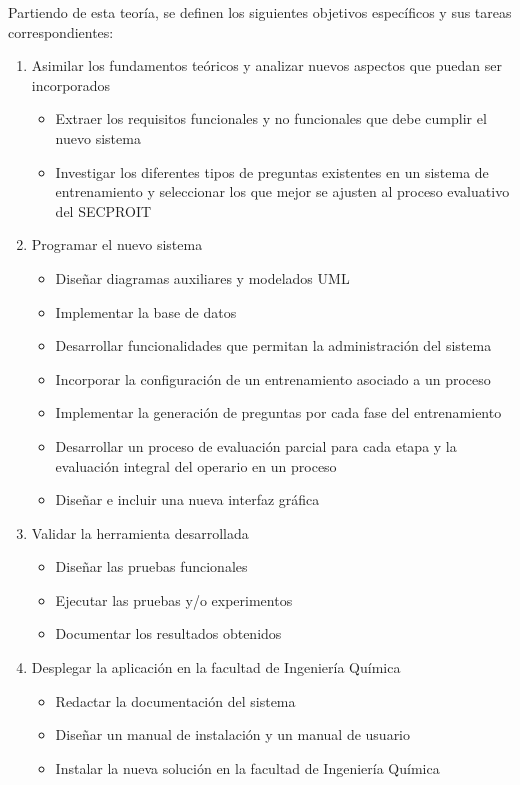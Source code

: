 Partiendo de esta teoría, se definen los siguientes objetivos específicos y sus tareas correspondientes:
\begin{enumerate}
\item Asimilar los fundamentos teóricos y analizar nuevos aspectos que puedan ser incorporados
\begin{itemize}
\item Extraer los requisitos funcionales y no funcionales que debe cumplir el nuevo sistema
\item Investigar los diferentes tipos de preguntas existentes en un
sistema de entrenamiento y seleccionar los que mejor se ajusten al proceso evaluativo del SECPROIT
\end{itemize}

\item Programar el nuevo sistema
\begin{itemize}
\item Diseñar diagramas auxiliares y modelados UML
\item Implementar la base de datos
\item Desarrollar funcionalidades que permitan la administración del sistema
\item Incorporar la configuración de un entrenamiento asociado a un proceso
\item Implementar la generación de preguntas por cada fase del entrenamiento
\item Desarrollar un proceso de evaluación parcial para cada etapa y la evaluación integral del operario en un proceso
\item Diseñar e incluir una nueva interfaz gráfica
\end{itemize}

\item Validar la herramienta desarrollada
\begin{itemize}
\item Diseñar las pruebas funcionales
\item Ejecutar las pruebas y/o experimentos
\item Documentar los resultados obtenidos
\end{itemize}

\item Desplegar la aplicación en la facultad de Ingeniería Química
\begin{itemize}
\item Redactar la documentación del sistema
\item Diseñar un manual de instalación y un manual de usuario
\item Instalar la nueva solución en la facultad de Ingeniería Química
\end{itemize}
\end{enumerate}

